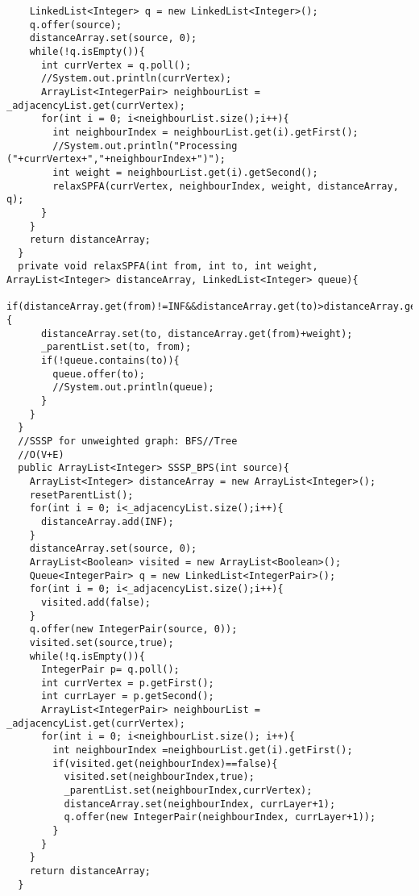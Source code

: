 \documentclass[11pt]{article}
\theoremstyle{definition}
\begin{document}
\begin{verbatim}
    LinkedList<Integer> q = new LinkedList<Integer>();
    q.offer(source);
    distanceArray.set(source, 0);
    while(!q.isEmpty()){
      int currVertex = q.poll();
      //System.out.println(currVertex);
      ArrayList<IntegerPair> neighbourList = _adjacencyList.get(currVertex);
      for(int i = 0; i<neighbourList.size();i++){
        int neighbourIndex = neighbourList.get(i).getFirst();
        //System.out.println("Processing ("+currVertex+","+neighbourIndex+")");
        int weight = neighbourList.get(i).getSecond();
        relaxSPFA(currVertex, neighbourIndex, weight, distanceArray, q);
      }
    }
    return distanceArray; 
  }
  private void relaxSPFA(int from, int to, int weight, ArrayList<Integer> distanceArray, LinkedList<Integer> queue){
    if(distanceArray.get(from)!=INF&&distanceArray.get(to)>distanceArray.get(from)+weight){
      distanceArray.set(to, distanceArray.get(from)+weight);
      _parentList.set(to, from);
      if(!queue.contains(to)){
        queue.offer(to);
        //System.out.println(queue);
      }
    }
  }
  //SSSP for unweighted graph: BFS//Tree
  //O(V+E)
  public ArrayList<Integer> SSSP_BPS(int source){
    ArrayList<Integer> distanceArray = new ArrayList<Integer>();
    resetParentList();
    for(int i = 0; i<_adjacencyList.size();i++){
      distanceArray.add(INF);
    }
    distanceArray.set(source, 0);
    ArrayList<Boolean> visited = new ArrayList<Boolean>();
    Queue<IntegerPair> q = new LinkedList<IntegerPair>();
    for(int i = 0; i<_adjacencyList.size();i++){
      visited.add(false);
    }
    q.offer(new IntegerPair(source, 0));
    visited.set(source,true);
    while(!q.isEmpty()){
      IntegerPair p= q.poll();
      int currVertex = p.getFirst();
      int currLayer = p.getSecond();
      ArrayList<IntegerPair> neighbourList =  _adjacencyList.get(currVertex);
      for(int i = 0; i<neighbourList.size(); i++){
        int neighbourIndex =neighbourList.get(i).getFirst();
        if(visited.get(neighbourIndex)==false){
          visited.set(neighbourIndex,true);
          _parentList.set(neighbourIndex,currVertex);
          distanceArray.set(neighbourIndex, currLayer+1);
          q.offer(new IntegerPair(neighbourIndex, currLayer+1));
        }
      }
    }
    return distanceArray;
  }
  

\end{verbatim}
\end{document}
